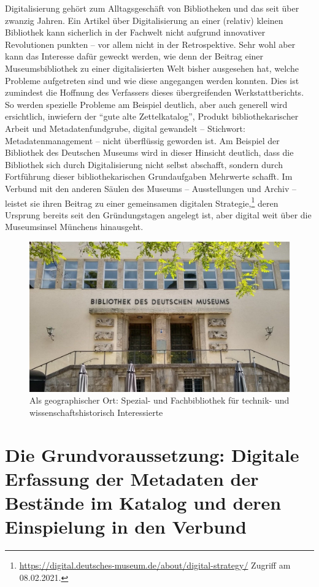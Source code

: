 \documentclass[a4paper,
fontsize=11pt,
oneside,
numbers=noperiodatend,
parskip=half-,
bibliography=totoc,
final
]{scrartcl}
\begin{document}
Digitalisierung gehört zum Alltagsgeschäft von Bibliotheken und das seit
über zwanzig Jahren. Ein Artikel über Digitalisierung an einer (relativ)
kleinen Bibliothek kann sicherlich in der Fachwelt nicht aufgrund
innovativer Revolutionen punkten -- vor allem nicht in der
Retrospektive. Sehr wohl aber kann das Interesse dafür geweckt werden,
wie denn der Beitrag einer Museumsbibliothek zu einer digitalisierten
Welt bisher ausgesehen hat, welche Probleme aufgetreten sind und wie
diese angegangen werden konnten. Dies ist zumindest die Hoffnung des
Verfassers dieses übergreifenden Werkstattberichts. So werden spezielle
Probleme am Beispiel deutlich, aber auch generell wird ersichtlich,
inwiefern der \enquote{gute alte Zettelkatalog}, Produkt
bibliothekarischer Arbeit und Metadatenfundgrube, digital gewandelt --
Stichwort: Metadatenmanagement -- nicht überflüssig geworden ist. Am
Beispiel der Bibliothek des Deutschen Museums wird in dieser Hinsicht
deutlich, dass die Bibliothek sich durch Digitalisierung nicht selbst
abschafft, sondern durch Fortführung dieser bibliothekarischen
Grundaufgaben Mehrwerte schafft. Im Verbund mit den anderen Säulen des
Museums -- Ausstellungen und Archiv -- leistet sie ihren Beitrag zu
einer gemeinsamen digitalen Strategie,\footnote{\url{https://digital.deutsches-museum.de/about/digital-strategy/}
  Zugriff am 08.02.2021.} deren Ursprung bereits seit den Gründungstagen
angelegt ist, aber digital weit über die Museumsinsel Münchens
hinausgeht.

\begin{figure}
\centering
\includegraphics[width=.9\textwidth]{img/Abb1.jpg}
\caption{Als geographischer Ort: Spezial- und Fachbibliothek für technik-
und wissenschaftshistorisch Interessierte}
\end{figure}

\hypertarget{die-grundvoraussetzung-digitale-erfassung-der-metadaten-der-bestuxe4nde-im-katalog-und-deren-einspielung-in-den-verbund}{%
\section{Die Grundvoraussetzung: Digitale Erfassung der Metadaten
der Bestände im Katalog und deren Einspielung in den
Verbund}\label{die-grundvoraussetzung-digitale-erfassung-der-metadaten-der-bestuxe4nde-im-katalog-und-deren-einspielung-in-den-verbund}}
\end{document}
